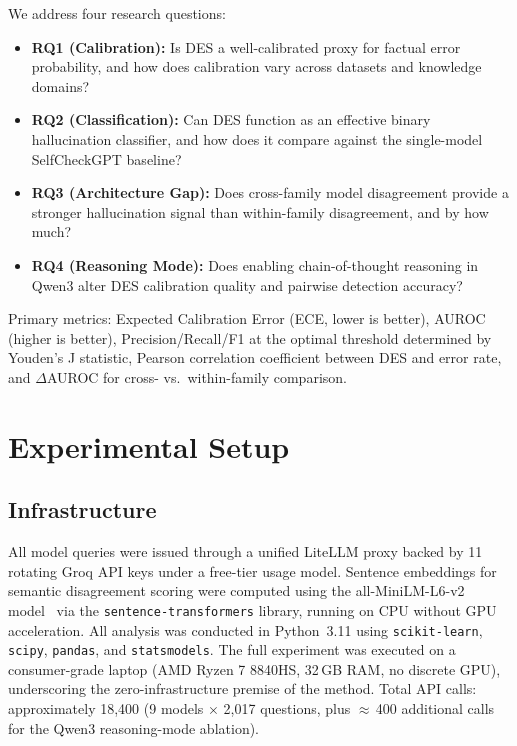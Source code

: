 \documentclass[journal]{IEEEtran}
\begin{document}
We address four research questions:

\begin{itemize}
  \item \textbf{RQ1 (Calibration):} Is DES a well-calibrated proxy for factual
    error probability, and how does calibration vary across datasets and
    knowledge domains?
  \item \textbf{RQ2 (Classification):} Can DES function as an effective binary
    hallucination classifier, and how does it compare against the
    single-model SelfCheckGPT baseline?
  \item \textbf{RQ3 (Architecture Gap):} Does cross-family model disagreement
    provide a stronger hallucination signal than within-family disagreement,
    and by how much?
  \item \textbf{RQ4 (Reasoning Mode):} Does enabling chain-of-thought reasoning in
    Qwen3 alter DES calibration quality and pairwise detection accuracy?
\end{itemize}

\noindent Primary metrics: Expected Calibration Error (ECE, lower is better),
AUROC (higher is better), Precision/Recall/F1 at the optimal threshold
determined by Youden's J statistic, Pearson correlation coefficient between
DES and error rate, and $\Delta$AUROC for cross- vs.\ within-family comparison.

\section{Experimental Setup}
\label{sec:setup}

\subsection{Infrastructure}

All model queries were issued through a unified LiteLLM proxy backed by
11 rotating Groq API keys under a free-tier usage model.
Sentence embeddings for semantic disagreement scoring were computed using
the all-MiniLM-L6-v2 model~\cite{reimers2019sbert} via the \texttt{sentence-transformers} library,
running on CPU without GPU acceleration.
All analysis was conducted in Python~3.11 using \texttt{scikit-learn},
\texttt{scipy}, \texttt{pandas}, and \texttt{statsmodels}.
The full experiment was executed on a consumer-grade laptop (AMD Ryzen 7
8840HS, 32\,GB RAM, no discrete GPU), underscoring the zero-infrastructure
premise of the method.
Total API calls: approximately 18,400 (9 models $\times$ 2,017 questions,
plus $\approx$\,400 additional calls for the Qwen3 reasoning-mode ablation).
\end{document}
